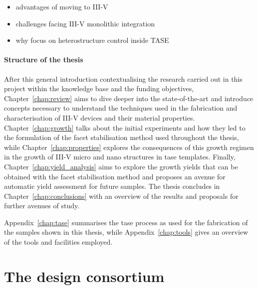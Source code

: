 \begin{itemize}
    \item advantages of moving to III-V
    \item challenges facing III-V monolithic integration
    \item why focus on heterostructure control inside TASE
\end{itemize}

\paragraph{Structure of the thesis} After this general introduction contextualising the research carried out in this project within the knowledge base and the funding objectives, Chapter~\ref{chap:review} aims to dive deeper into the state-of-the-art and introduce concepts necessary to understand the techniques used in the fabrication and characterisation of III-V devices and their material properties. Chapter~\ref{chap:growth} talks about the initial experiments and how they led to the formulation of the facet stabilisation method used throughout the thesis, while Chapter~\ref{chap:properties} explores the consequences of this growth regimen in the growth of III-V micro and nano structures in \acs{tase} templates. Finally, Chapter~\ref{chap:yield_analysis} aims to explore the growth yields that can be obtained with the facet stabilisation method and proposes an avenue for automatic yield assessment for future samples. The thesis concludes in Chapter~\ref{chap:conclusions} with an overview of the results and proposals for further avenues of study. 

Appendix~\ref{chap:tase} summarises the \acs{tase} process as used for the fabrication of the samples shown in this thesis, while Appendix~\ref{chap:tools} gives an overview of the tools and facilities employed.

\section{\texorpdfstring{The \acs{design} consortium}{The DESIGN-EID consortium}}

